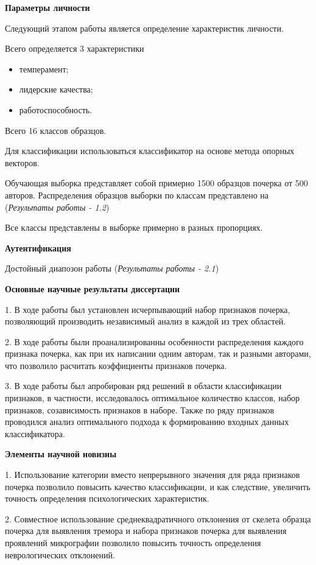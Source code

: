\textbf{Параметры личности}
\bigskip

Следующий этапом работы является определение характеристик личности.

Всего определяется 3 характеристики
\begin{itemize}
  \item темперамент;
  \item лидерские качества;
  \item работоспособность.
\end{itemize}

Всего 16 классов образцов.

Для классификации использоваться классификатор на основе метода опорных векторов.

Обучающая выборка представляет собой примерно 1500 образцов почерка от 500 авторов.
Распределения образцов выборки по классам представлено на (\emph{Результаты работы - 1.2})

Все классы представлены в выборке примерно в разных пропорциях.

\textbf{Аутентификация}
\bigskip

Достойный диапозон работы (\emph{Результаты работы - 2.1})

\textbf{Основные научные результаты диссертации}
\bigskip

1. В ходе работы был установлен исчерпывающий набор признаков почерка, позволяющий производить независимый анализ в каждой из трех областей.

2. В ходе работы были проанализированны особенности распределения каждого признака почерка, как при их написании одним авторам, так и разными авторами, что позволило расчитать коэффициенты признаков почерка.

3. В ходе работы был апробирован ряд решений в области классификации признаков, в частности, исследовалось оптимальное количество классов, набор признаков, созависимость признаков в наборе. Также по ряду признаков проводился анализ оптимального подхода к формированию входных данных классификатора.

\textbf{Элементы научной новизны}
\bigskip

1. Использование категории вместо непрерывного значения для ряда признаков почерка позволило повысить качество классификации, и как следствие, увеличить точность определения психологических характеристик.

2. Совместное использование среднеквадратичного отклонения от скелета образца почерка для выявления тремора и набора признаков почерка для выявления проявлений микрографии позволило повысить точность определения неврологических отклонений.

